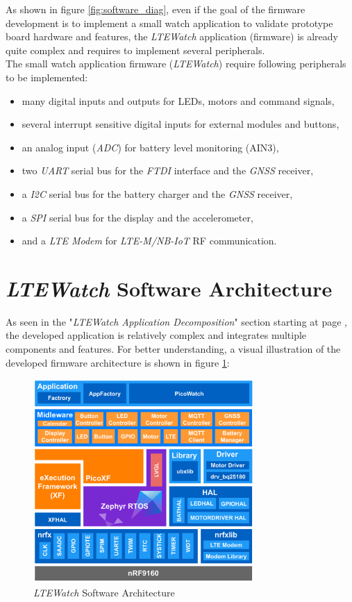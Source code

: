 \documentclass[report.tex]{subfiles}
\begin{document}
As shown in figure \ref{fig:software_diag}, even if the goal of the firmware development is to implement a small watch application to validate prototype board hardware and features, the \textit{LTEWatch} application (firmware) is already quite complex and requires to implement several  peripherals.\\

The small watch application firmware (\textit{LTEWatch}) require following peripherals to be implemented:
\begin{itemize}
\item many digital inputs and outputs for LEDs, motors and command signals,
\item several interrupt sensitive digital inputs for external modules and buttons,
\item an analog input (\textit{ADC}) for battery level monitoring (AIN3),
\item two \textit{UART} serial bus for the \textit{FTDI} interface and the \textit{GNSS} receiver,
\item a \textit{I2C} serial bus for the battery charger and the \textit{GNSS} receiver,
\item a \textit{SPI} serial bus for the display and the accelerometer,
\item and a \textit{LTE Modem} for \textit{LTE-M/NB-IoT} RF communication.
\end{itemize}

\pagebreak

\section{\textit{LTEWatch} Software Architecture}

As seen in the "\textit{LTEWatch Application Decomposition}" section starting at page \pageref{sec:ltewatch_app_decomp}, the developed application is relatively complex and integrates multiple components and features. For better understanding, a visual illustration of the developed firmware architecture is shown in figure \ref{fig:software_layers}:

\begin{figure}[H]
	\centering
	\includegraphics[width=0.75\textwidth]{Include/Figure/software/software_layers.pdf}
	\caption{\textit{LTEWatch} Software Architecture}
	\label{fig:software_layers}
\end{figure}
\end{document}
